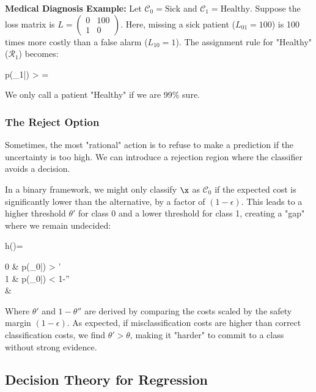 \begin{myexample}
\textbf{Medical Diagnosis Example:} 
Let $\mathcal{C}_0 = \text{Sick}$ and $\mathcal{C}_1 = \text{Healthy}$. Suppose the loss matrix is $L = \begin{pmatrix} 0 & 100 \\ 1 & 0 \end{pmatrix}$. 
Here, missing a sick patient ($L_{01}=100$) is 100 times more costly than a false alarm ($L_{10}=1$).
The assignment rule for "Healthy" ($\mathcal{R}_1$) becomes:
\begin{myalign}
p(_1|\x) >  =  
\end{myalign}
We only call a patient "Healthy" if we are 99\% sure.
\end{myexample}

\subsubsection*{The Reject Option}

Sometimes, the most "rational" action is to refuse to make a prediction if the uncertainty is too high. We can introduce a \alert{rejection region} where the classifier avoids a decision. 

In a binary framework, we might only classify $\x$ as $\mathcal{C}_0$ if the expected cost is significantly lower than the alternative, by a factor of $(1-\epsilon)$. This leads to a higher threshold $\theta'$ for class 0 and a lower threshold for class 1, creating a "gap" where we remain undecided:
\begin{myequation}
	h(\x)=\begin{cases}
		0 &  p(_0|\x) > \theta' \\
		1 &  p(_0|\x) < 1-\theta'' \\
		 & 
	\end{cases}
\end{myequation}
Where $\theta'$ and $1-\theta''$ are derived by comparing the costs scaled by the safety margin $(1-\epsilon)$. As expected, if misclassification costs are higher than correct classification costs, we find $\theta' > \theta$, making it "harder" to commit to a class without strong evidence.



\subsection*{Decision Theory for Regression}

